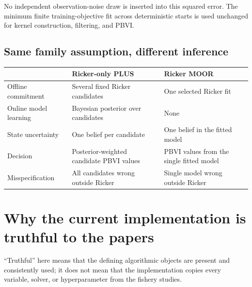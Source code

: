 \documentclass[11pt]{article}
\begin{document}
No independent observation-noise draw is inserted into this squared error. The minimum finite
training-objective fit across deterministic starts is used unchanged for kernel construction,
filtering, and PBVI.

\subsection{Same family assumption, different inference}

\begin{center}
\begin{tabularx}{\textwidth}{L{0.24\textwidth}YY}
\toprule
 & \textbf{Ricker-only PLUS} & \textbf{Ricker MOOR} \\
\midrule
Offline commitment & Several fixed Ricker candidates & One selected Ricker fit \\
Online model learning & Bayesian posterior over candidates & None \\
State uncertainty & One belief per candidate & One belief in the fitted model \\
Decision & Posterior-weighted candidate PBVI values & PBVI values from the single fitted model \\
Misspecification & All candidates wrong outside Ricker & Single model wrong outside Ricker \\
\bottomrule
\end{tabularx}
\end{center}

\section{Why the current implementation is truthful to the papers}

``Truthful'' here means that the defining algorithmic objects are present and consistently used;
it does not mean that the implementation copies every variable, solver, or hyperparameter from the
fishery studies.
\end{document}

